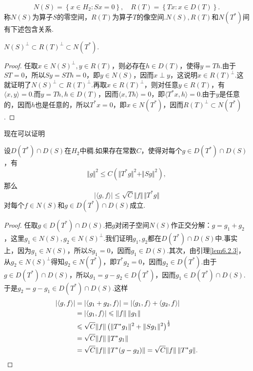 \[N(S)=\left\{x\in H_2\colon Sx=0\right\},\quad R(T)=\left\{Tx\colon x\in D(T)\right\}.\]
称$N(S)$为算子$S$的零空间，$R(T)$为算子$T$的像空间.$N(S),R(T)$和$N(T^\ast)$间有下述包含关系.
\begin{lemma}\label{lem6.2.3}
	$N(S)^\perp \subset R(T)^\perp \subset N(T^\ast)$.
\end{lemma}
\begin{proof}
	任取$x\in N(S)^\perp,y\in R(T)$，则必存在$h\in D(T)$，使得$y=Th$.由于$ST=0$，所以$Sy=STh=0$，即$y\in N(S)$，因而$x\perp y$，这说明$x\in R(T)^\perp$.这就证明了$N(S)^\perp \subset R(T)^\perp$.再取$x\in R(T)^\perp$，则对任意$y\in R(T)$，有$\langle x,y\rangle=0$.而$y=Th,h\in D(T)$，因而$\langle x,Th\rangle=0$，即$\langle T^\ast x,h\rangle=0$.由于$y$是任意的，因而$h$也是任意的，所以$T^\ast x=0$，即$x\in N(T^\ast)$，因而$R(T)^\perp \subset N(T^\ast)$.
\end{proof}
现在可以证明
\begin{prop}\label{prop6.2.4}
	设$D(T^\ast)\cap D(S)$在$H_2$中稠.如果存在常数$C$，使得对每个$g\in D(T^\ast)\cap D(S)$，有
	\begin{equation}\label{eq6.2.4}
		\Vert g\Vert^2\le C\left(\Vert T^\ast g\Vert^2+\Vert Sg\Vert^2\right),
	\end{equation}
那么
\begin{equation}\label{eq6.2.5}
	|\langle g,f\rangle|\le\sqrt{C}\Vert f\Vert\,\Vert T^\ast g\Vert
\end{equation}
对每个$f\in N(S)$和$g\in D(T^\ast)\cap D(S)$成立.
\end{prop}
\begin{proof}
	任取$g\in D(T^\ast)\cap D(S)$.把$g$对闭子空间$N(S)$作正交分解：$g=g_1+g_2$，这里$g_1\in N(S),g_2\in N(S)^\perp$.我们证明$g_1,g_2$都在$D(T^\ast)\cap D(S)$中.事实上，因为$g_1\in N(S)$，所以$Sg_1=0$，因而$g_1\in D(S)$.其次，由引理\ref{lem6.2.3}，从$g_2\in N(S)^\perp$得知$g_2\in N(T^\ast)$，即$T^\ast g_2=0$，因而$g_2\in D(T^\ast)$.由于$g\in D(T^\ast)\cap D(S)$，所以$g_1=g-g_2\in D(T^\ast)$，因而$g_1\in D(T^\ast)\cap D(S)$.于是$g_2=g-g_1\in D(T^\ast)\cap D(S)$.这样
	\begin{align*}
		|\langle g,f\rangle|
		&=|\langle g_1+g_2,f\rangle|=|\langle g_1,f\rangle+\langle g_2,f\rangle|\\
		&=|\langle g_1,f\rangle|\le\Vert f\Vert\,\Vert g_1\Vert\\
		&\le\sqrt{C}\Vert f\Vert\left(\Vert T^\ast g_1\Vert^2+\Vert Sg_1\Vert^2\right)^{\frac12}\\
		&=\sqrt{C}\Vert f\Vert\,\Vert T^\ast g_1\Vert\\
		&=\sqrt{C}\Vert f\Vert\,\Vert T^\ast(g-g_2)\Vert=\sqrt{C}\Vert f\Vert\,\Vert T^\ast g\Vert.\qedhere
	\end{align*}
\end{proof}
